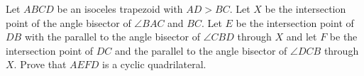 Let $ABCD$ be an isoceles trapezoid with $AD>BC$.
Let $X$ be the intersection point of the angle bisector of $\angle BAC$ and $BC$.
Let $E$ be the intersection point of $DB$ with the parallel to the angle bisector of $\angle CBD$ through $X$
and let $F$ be the intersection point of $DC$ and the parallel to the angle bisector of $\angle DCB$ through $X$.
Prove that $AEFD$ is a cyclic quadrilateral.
